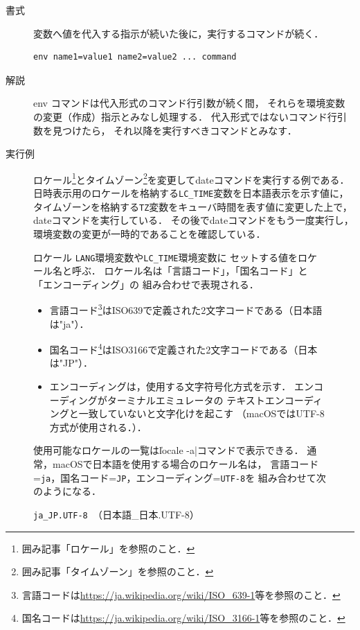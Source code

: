 \begin{description}
\item [書式]
  変数へ値を代入する指示が続いた後に，実行するコマンドが続く．
\begin{lstlisting}[numbers=none]
  env name1=value1 name2=value2 ... command
\end{lstlisting}
\item [解説]
  env コマンドは代入形式のコマンド行引数が続く間，
  それらを環境変数の変更（作成）指示とみなし処理する．
  代入形式ではないコマンド行引数を見つけたら，
  それ以降を実行すべきコマンドとみなす．
\item [実行例]
  ロケール\footnote{
    囲み記事「ロケール」を参照のこと．
  }とタイムゾーン\footnote{
    囲み記事「タイムゾーン」を参照のこと．
  }を変更してdateコマンドを実行する例である．
  日時表示用のロケールを格納する\texttt{LC\_TIME}変数を日本語表示を示す値に，
  タイムゾーンを格納する\texttt{TZ}変数をキューバ時間を表す値に変更した上で，
  dateコマンドを実行している．
  その後でdateコマンドをもう一度実行し，
  環境変数の変更が一時的であることを確認している．
  
\end{description}

\begin{figure}[btp]
\begin{itembox}[l]{ロケール}
\texttt{LANG}環境変数や\texttt{LC\_TIME}環境変数に
セットする値をロケール名と呼ぶ．
ロケール名は「言語コード」，「国名コード」と「エンコーディング」の
組み合わせで表現される．

\begin{itemize}
\item
  言語コード\footnote{
  言語コードは\url{https://ja.wikipedia.org/wiki/ISO_639-1}等を参照のこと．
  }はISO639で定義された2文字コードである（日本語は"ja"）．
\item 
  国名コード\footnote{
    国名コードは\url{https://ja.wikipedia.org/wiki/ISO_3166-1}等を参照のこと．
  }はISO3166で定義された2文字コードである（日本は"JP"）．
\item
  エンコーディングは，使用する文字符号化方式を示す．
  エンコーディングがターミナルエミュレータの
  テキストエンコーディングと一致していないと文字化けを起こす
  （macOSではUTF-8方式が使用される．）．
\end{itemize}

使用可能なロケールの一覧は\|locale -a|コマンドで表示できる．
通常，macOSで日本語を使用する場合のロケール名は，
言語コード=\texttt{ja}，国名コード=\texttt{JP}，エンコーディング=\texttt{UTF-8}を
組み合わせて次のようになる．

\centerline{\texttt{ja\_JP.UTF-8 }（日本語\_日本.UTF-8）}
\end{itembox}
\end{figure}

